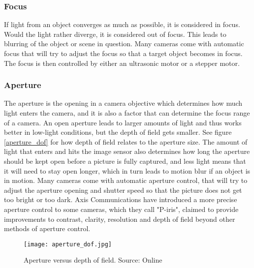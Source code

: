 \subsubsection{Focus}
If light from an object converges as much as possible, it is considered in focus. Would the light rather diverge, it is considered out of focus. This leads to blurring of the object or scene in question.
Many cameras come with automatic focus that will try to adjust the focus so that a target object becomes in focus. The focus is then controlled by either an ultrasonic motor or a stepper motor.

\subsubsection{Aperture}
The aperture is the opening in a camera objective which determines how much light enters the camera, and it is also a factor that can determine the focus range of a camera. An open aperture leads to larger amounts of light and thus works better in low-light conditions, but the depth of field gets smaller. See figure \ref{aperture_dof} for how depth of field relates to the aperture size. The amount of light that enters and hits the image sensor also determines how long the aperture should be kept open before a picture is fully captured, and less light means that it will need to stay open longer, which in turn leads to motion blur if an object is in motion.
Many cameras come with automatic aperture control, that will try to adjust the aperture opening and shutter speed so that the picture does not get too bright or too dark. Axis Communications have introduced a more precise aperture control to some cameras, which they call "P-iris", claimed to provide improvements to contrast, clarity, resolution and depth of field beyond other methods of aperture control.

\begin{figure}[ht]
    \centering
    \texttt{[image: aperture\_dof.jpg]}
    \caption{Aperture versus depth of field. Source: Online \citet{aperturedof15}}
    \label{fig:aperture_dof}
\end{figure}
\FloatBarrier

